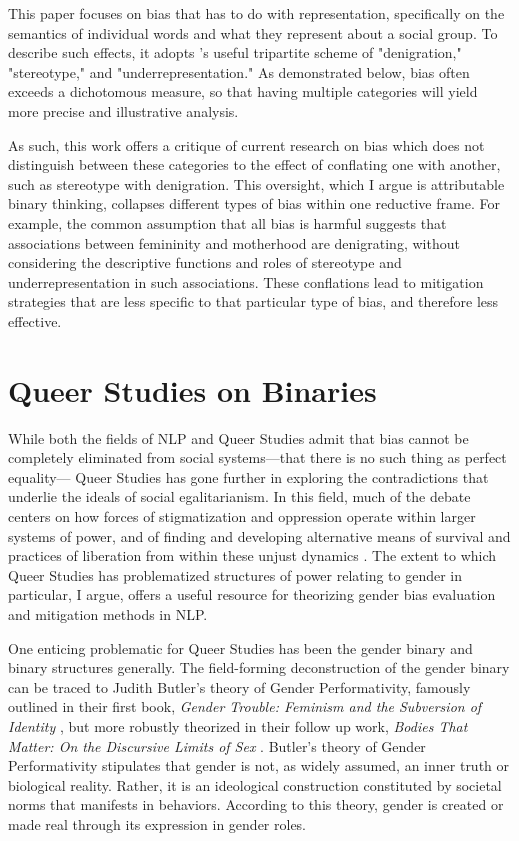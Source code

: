 \documentclass[11pt]{article}
\begin{document}
This paper focuses on bias that has to do with representation, specifically
on the semantics of individual words and what they represent about a social group. To describe such effects, it
adopts \citet{nemani:2023}'s useful tripartite scheme of "denigration,"
"stereotype," and "underrepresentation." As demonstrated below, bias often exceeds a dichotomous
measure, so that having multiple categories will yield more precise and
illustrative analysis.

As such, this work offers a critique of current research on bias which does
not distinguish between these categories to the effect of conflating one with another, such as stereotype with denigration. This oversight, which I
argue is attributable binary thinking, collapses different types of
bias within one reductive frame. For example, the common assumption
that all bias is harmful suggests that associations between femininity
and motherhood are denigrating, without considering the descriptive functions and roles of stereotype and underrepresentation in such associations. These
conflations lead to mitigation strategies that are less specific to
that particular type of bias, and therefore less effective.

\section{Queer Studies on Binaries}

While both the fields of NLP and Queer Studies admit that bias cannot be
completely eliminated from social systems---that there is no such thing as perfect equality---
Queer Studies has gone further in exploring the contradictions that underlie
the ideals of social egalitarianism. In this field, much of the debate centers on how forces of stigmatization and
oppression operate within larger systems of power, and of finding and developing alternative
means of survival and practices of liberation from within these unjust dynamics \citep{love:2009,butler:1993,munoz:2009}.
The extent to which Queer Studies has problematized structures of power relating to
gender in particular, I argue, offers a useful resource for theorizing gender bias evaluation and mitigation
methods in NLP.

One enticing problematic for Queer Studies has been the gender binary and binary structures generally. 
The field-forming deconstruction of the gender binary can be traced
to Judith Butler's theory of Gender Performativity, famously outlined
in their first book, \emph{Gender Trouble: Feminism and the Subversion
of Identity} \citep{butler:1990}, but more robustly theorized in their
follow up work,
\emph{Bodies That Matter: On the Discursive Limits of Sex} \citep{butler:1993}. Butler's
theory of Gender Performativity stipulates that gender is not, as
widely assumed, an inner truth or biological reality. Rather, it is an
ideological construction constituted by societal norms that manifests
in behaviors. According to this theory, gender is created or made real
through its expression in gender roles.
\end{document}
